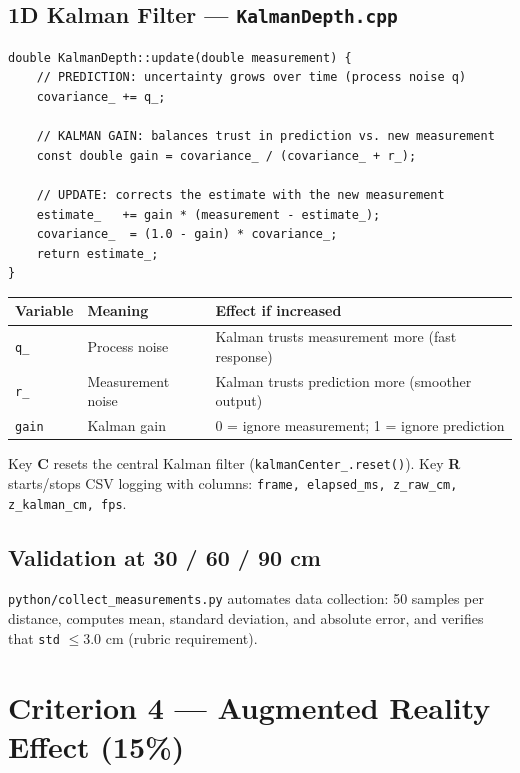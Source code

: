\documentclass[11pt,a4paper]{article}
\begin{document}
\subsection*{1D Kalman Filter --- \texttt{KalmanDepth.cpp}}

\begin{lstlisting}[caption={Scalar Kalman filter (the 3 key equations)}]
double KalmanDepth::update(double measurement) {
    // PREDICTION: uncertainty grows over time (process noise q)
    covariance_ += q_;

    // KALMAN GAIN: balances trust in prediction vs. new measurement
    const double gain = covariance_ / (covariance_ + r_);

    // UPDATE: corrects the estimate with the new measurement
    estimate_   += gain * (measurement - estimate_);
    covariance_  = (1.0 - gain) * covariance_;
    return estimate_;
}
\end{lstlisting}

\begin{center}
\begin{tabular}{lll}
\toprule
\textbf{Variable} & \textbf{Meaning} & \textbf{Effect if increased} \\
\midrule
\texttt{q\_}   & Process noise     & Kalman trusts measurement more (fast response) \\
\texttt{r\_}   & Measurement noise & Kalman trusts prediction more (smoother output) \\
\texttt{gain}  & Kalman gain       & 0 = ignore measurement; 1 = ignore prediction \\
\bottomrule
\end{tabular}
\end{center}

\noindent Key \textbf{C} resets the central Kalman filter (\texttt{kalmanCenter\_.reset()}).
Key \textbf{R} starts/stops CSV logging with columns: \texttt{frame, elapsed\_ms, z\_raw\_cm, z\_kalman\_cm, fps}.

\subsection*{Validation at 30 / 60 / 90 cm}
\texttt{python/collect\_measurements.py} automates data collection:
50 samples per distance, computes mean, standard deviation, and absolute error,
and verifies that \texttt{std} $\leq 3.0$ cm (rubric requirement).

\section{Criterion 4 --- Augmented Reality Effect (15\%)}
\end{document}
